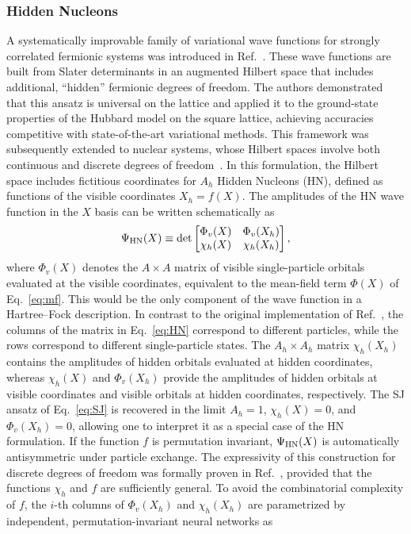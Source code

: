 \subsubsection{Hidden Nucleons}
\label{subsub:hidden_nucleons}
A systematically improvable family of variational wave functions for strongly correlated fermionic systems was introduced in Ref.~\cite{moreno_fermionic_2022}. These wave functions are built from Slater determinants in an augmented Hilbert space that includes additional, ``hidden'' fermionic degrees of freedom. The authors demonstrated that this ansatz is universal on the lattice and applied it to the ground-state properties of the Hubbard model on the square lattice, achieving accuracies competitive with state-of-the-art variational methods.
This framework was subsequently extended to nuclear systems, whose Hilbert spaces involve both continuous and discrete degrees of freedom~\cite{lovato_hidden-nucleons_2022}. In this formulation, the Hilbert space includes fictitious coordinates for $A_h$ Hidden Nucleons (HN), defined as functions of the visible coordinates $X_h = f(X)$. The amplitudes of the HN wave function in the $X$ basis can be written schematically as
\begin{equation} 
\Psi_{\rm HN}(X)\equiv \det 
\begin{bmatrix} \Phi_v(X) & \Phi_v(X_h)\\ \chi_h(X) & \chi_h(X_h)\\ \end{bmatrix} ,
\label{eq:HN} 
\end{equation}
where $\Phi_v(X)$ denotes the $A\times A$ matrix of visible single-particle orbitals evaluated at the visible coordinates, equivalent to the mean-field term $\Phi(X)$ of Eq.~\eqref{eq:mf}. This would be the only component of the wave function in a Hartree–Fock description. In contrast to the original implementation of Ref.~\cite{moreno_fermionic_2022}, the columns of the matrix in Eq.~\eqref{eq:HN} correspond to different particles, while the rows correspond to different single-particle states. The $A_h\times A_h$ matrix $\chi_h(X_h)$ contains the amplitudes of hidden orbitals evaluated at hidden coordinates, whereas $\chi_h(X)$ and $\Phi_v(X_h)$ provide the amplitudes of hidden orbitals at visible coordinates and visible orbitals at hidden coordinates, respectively.
The SJ ansatz of Eq.~\eqref{eq:SJ} is recovered in the limit $A_h=1$, $\chi_h(X)=0$, and $\Phi_v(X_h)=0$, allowing one to interpret it as a special case of the HN formulation. If the function $f$ is permutation invariant, $\Psi_{\rm HN}(X)$ is automatically antisymmetric under particle exchange. The expressivity of this construction for discrete degrees of freedom was formally proven in Ref.~\cite{moreno_fermionic_2022}, provided that the functions $\chi_h$ and $f$ are sufficiently general. To avoid the combinatorial complexity of $f$, the $i$-th columns of $\Phi_v(X_h)$ and $\chi_h(X_h)$ are parametrized by independent, permutation-invariant neural networks as
